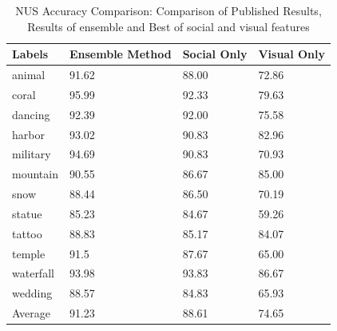 \begin{table}
\centering
\caption{ NUS Accuracy Comparison: Comparison of Published Results, Results of ensemble and Best of social and visual features} %
\vspace*{0.2 cm}
\begin{tabular}{| p{1.7cm}| p{1.5cm}|p{1.2cm}|p{1.2cm}|} \hline
Labels &  Ensemble Method & Social Only & Visual Only  \\  [1ex] \hline
animal & 91.62 & 88.00 & 72.86 \\  [1ex] \hline
coral & 95.99 & 92.33 & 79.63 \\  [1ex] \hline
dancing & 92.39 & 92.00 & 75.58 \\  [1ex] \hline
harbor & 93.02 & 90.83 & 82.96 \\  [1ex] \hline
military & 94.69 & 90.83 & 70.93 \\  [1ex] \hline
mountain & 90.55 & 86.67 & 85.00 \\  [1ex] \hline
snow & 88.44 & 86.50 & 70.19 \\  [1ex] \hline
statue & 85.23 & 84.67 & 59.26 \\  [1ex] \hline
tattoo & 88.83 & 85.17 & 84.07 \\  [1ex] \hline
temple & 91.5 & 87.67 & 65.00 \\  [1ex] \hline
waterfall & 93.98 & 93.83 & 86.67 \\  [1ex] \hline
wedding & 88.57 & 84.83 & 65.93 \\  [1ex] \hline
Average & 91.23 & 88.61 & 74.65 \\  [1ex] \hline
\end{tabular}
 \label{NUSAccuracyOverAll} %
\end{table}
